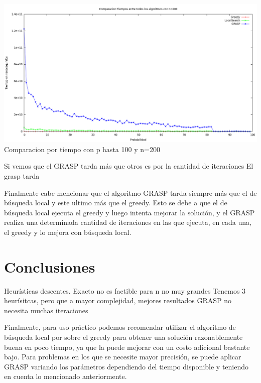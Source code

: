 \begin{center}
\includegraphics[width=17cm]{./graficos/comparaciontiemposprobvariablen200.png}\\
Comparacion por tiempo con p hasta 100 y n=200
\end{center}


Si vemos que el GRASP tarda más que otros es por la cantidad de iteraciones
El grasp tarda 

Finalmente cabe mencionar que el algoritmo GRASP tarda siempre más que el de búsqueda local y este ultimo más que el
greedy. Esto se debe a que el de búsqueda local ejecuta el greedy y luego intenta mejorar la solución, y el GRASP realiza una
determinada cantidad de iteraciones en las que ejecuta, en cada una, el greedy y lo mejora con búsqueda local.


\section{Conclusiones}
Heurísticas descentes. Exacto no es factible para n no muy grandes
Tenemos 3 heurísitcas, pero que a mayor complejidad, mejores resultados
GRASP no necesita muchas iteraciones


Finalmente, para uso práctico podemos recomendar utilizar el algoritmo de búsqueda local por sobre el greedy para obtener
una solución razonablemente buena en poco tiempo, ya que la puede mejorar con un costo adicional bastante bajo. Para problemas
en los que se necesite mayor precisión, se puede aplicar GRASP variando los parámetros dependiendo del tiempo disponible y
teniendo en cuenta lo mencionado anteriormente.







